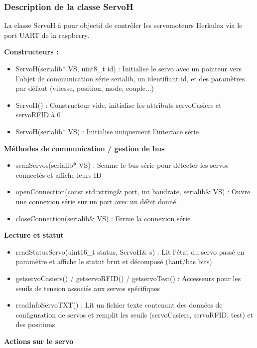 \documentclass[main.tex]{subfiles}
\begin{document}
\subsubsection{Description de la classe ServoH}

La classe ServoH à pour objectif de contrôler les servomoteurs Herkulex via le port UART de la raspberry.
 
\textbf{Constructeurs :}

\begin{itemize}
\item ServoH(serialib* VS, uint8\_t id) : Initialise le servo avec un pointeur vers l’objet de communication série serialib, un identifiant id, et des paramètres par défaut (vitesse, position, mode, couple...)
\item ServoH() : Constructeur vide, initialise les attributs servoCasiers et servoRFID à 0
\item ServoH(serialib* VS) : Initialise uniquement l’interface série
\end{itemize}
 
 
\textbf{Méthodes de communication / gestion de bus}

\begin{itemize}
\item scanServos(serialib* VS) : Scanne le bus série pour détecter les servos connectés et affiche leurs ID
\item openConnection(const std::string\& port, int baudrate, serialib\& VS) : Ouvre une connexion série sur un port avec un débit donné
\item closeConnection(serialib\& VS) : Ferme la connexion série
\end{itemize}
 
\textbf{Lecture et statut}

\begin{itemize}
\item readStatusServo(uint16\_t status, ServoH\& s) : Lit l’état du servo passé en paramètre et affiche le statut brut et décomposé (haut/bas bits)
\item getservoCasiers() / getservoRFID() / getservoTest() : Accesseurs pour les seuils de tension associés aux servos spécifiques
\item readInfoServoTXT() : Lit un fichier texte contenant des données de configuration de servos et remplit les seuils (servoCasiers, servoRFID, test) et des positions
\end{itemize}

\textbf{Actions sur le servo}
\end{document}
